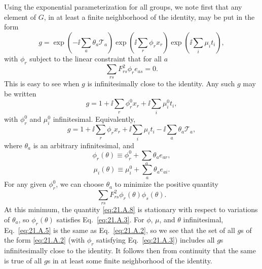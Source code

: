 Using the exponential parameterization for all groups, we note first that
any element of $G$, in at least a finite neighborhood of the identity, may be
put in the form
\begin{equation}
 g=\exp\left(-\ii\sum_a\theta_a\mathcal T_a\right)
 \exp\left(\ii\sum_r\phi_r x_r\right)
 \exp\left(\ii\sum_i\mu_i t_i\right),
 \tag{21.A.2}\label{eq:21.A.2}
\end{equation}
with $\phi_r$ subject to the linear constraint that for all $a$
\begin{equation}
 \sum_{rs}F_{rs}^2\phi_r e_{a s}=0.
 \tag{21.A.3}\label{eq:21.A.3}
\end{equation}
This is easy to see when $g$ is infinitesimally close to the identity. Any such
$g$ may be written
\begin{equation}
 g=1+\ii\sum_r\phi_r^0x_r+\ii\sum_i\mu_i^0t_i,
 \tag{21.A.4}\label{eq:21.A.4}
\end{equation}
with $\phi_r^0$ and $\mu_i^0$ infinitesimal. Equivalently,
\begin{equation}
 g=1+\ii\sum_r\phi_rx_r+\ii\sum_i\mu_it_i
 -\ii\sum_a\theta_a\mathcal T_a,
 \tag{21.A.5}\label{eq:21.A.5}
\end{equation}
where $\theta_a$ is an arbitrary infinitesimal, and
\begin{equation}
 \phi_r(\theta)\equiv\phi_r^0+\sum_a\theta_a e_{a r},
 \tag{21.A.6}\label{eq:21.A.6}
\end{equation}
\begin{equation}
 \mu_i(\theta)\equiv\mu_i^0+\sum_a\theta_a e_{a i}.
 \tag{21.A.7}\label{eq:21.A.7}
\end{equation}
For any given $\phi_r^0$, we can choose $\theta_a$ to minimize the positive
quantity
\begin{equation}
 \sum_{rs}F_{rs}^2\phi_r(\theta)\phi_s(\theta).
 \tag{21.A.8}\label{eq:21.A.8}
\end{equation}
At this minimum, the quantity \eqref{eq:21.A.8} is stationary with respect to
variations of $\theta_a$, so $\phi_r(\theta)$ satisfies
Eq.~\eqref{eq:21.A.3}. For $\phi$, $\mu$, and $\theta$ infinitesimal,
Eq.~\eqref{eq:21.A.5} is the same as Eq.~\eqref{eq:21.A.2}, so we see that the
set of all $g$s of the form \eqref{eq:21.A.2} (with $\phi_r$ satisfying
Eq.~\eqref{eq:21.A.3}) includes all $g$s infinitesimally close to the identity.
It follows then from continuity that the same is true of all $g$s in at least
some finite neighborhood of the identity.

